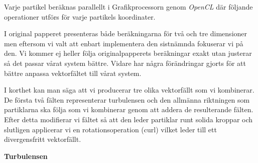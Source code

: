 \documentclass[a4paper]{article}
\begin{document}
\begin{multicols}{2}
    Varje partikel beräknas parallellt i Grafikprocessorn genom \textit{OpenCL} där följande operationer utförs för varje partikels koordinater.

    I original papperet presenteras både beräkningarna för två och tre dimensioner men eftersom vi valt att enbart implementera den sistnämnda fokuserar vi på den. Vi kommer ej heller följa originalpapperets beräkningar exakt utan justerar så det passar vårat system bättre. Vidare har några förändringar gjorts för att bättre anpassa vektorfältet till vårat system.

    I korthet kan man säga att vi producerar tre olika vektorfällt som vi kombinerar. De första två fälten representerar turbulensen och den allmänna riktningen som partiklarna ska följa som vi kombinerar genom att addera de resulterande fälten. Efter detta modifierar vi fältet så att den leder partiklar runt solida kroppar och slutligen applicerar vi en rotationsoperation (curl) vilket leder till ett divergensfritt vektorfällt.

    \textbf{Turbulensen}


\end{multicols}
\end{document}
